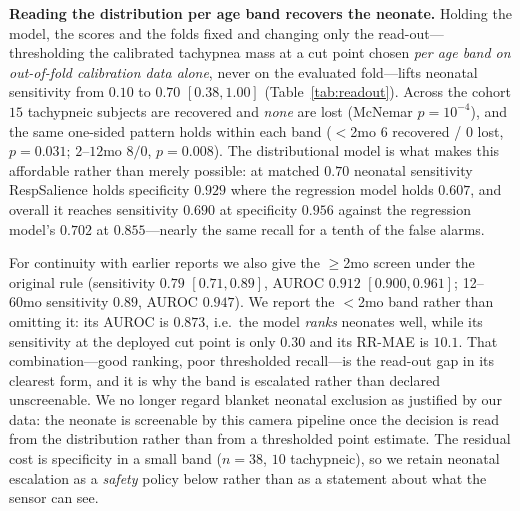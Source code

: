 \documentclass[journal]{IEEEtran}
\begin{document}
\textbf{Reading the distribution per age band recovers the neonate.} Holding the model, the scores and
the folds fixed and changing only the read-out---thresholding the calibrated tachypnea mass at a cut
point chosen \emph{per age band on out-of-fold calibration data alone}, never on the evaluated
fold---lifts neonatal sensitivity from $0.10$ to $0.70$ $[0.38,1.00]$ (Table~\ref{tab:readout}). Across
the cohort $15$ tachypneic subjects are recovered and \emph{none} are lost (McNemar $p=10^{-4}$), and the
same one-sided pattern holds within each band ($<$2mo $6$ recovered / $0$ lost, $p=0.031$; $2$--$12$mo
$8/0$, $p=0.008$). The distributional model is what makes this affordable rather than merely possible:
at matched $0.70$ neonatal sensitivity RespSalience holds specificity $0.929$ where the
regression model holds $0.607$, and overall it reaches sensitivity $0.690$ at specificity $0.956$
against the regression model's $0.702$ at $0.855$---nearly the same recall for a tenth of the false
alarms.

For continuity with earlier reports we also give the $\ge$2mo screen under the original rule
(sensitivity $0.79$ $[0.71,0.89]$, AUROC $0.912$ $[0.900,0.961]$; 12--60mo sensitivity $0.89$, AUROC
$0.947$). We report the $<$2mo band rather than omitting it: its AUROC is
$0.873$, i.e.\ the model \emph{ranks} neonates well, while its sensitivity at the deployed cut point is
only $0.30$ and its RR-MAE is $10.1$. That combination---good ranking, poor thresholded recall---is the
read-out gap in its clearest form, and it is why the band is escalated rather than declared
unscreenable. We no longer regard blanket neonatal exclusion as justified by our data: the neonate is
screenable by this camera pipeline once the decision is read from the distribution rather than from a
thresholded point estimate. The residual cost is specificity in a small band ($n{=}38$, $10$
tachypneic), so we retain neonatal escalation as a \emph{safety} policy below rather than as a
statement about what the sensor can see.
\end{document}
